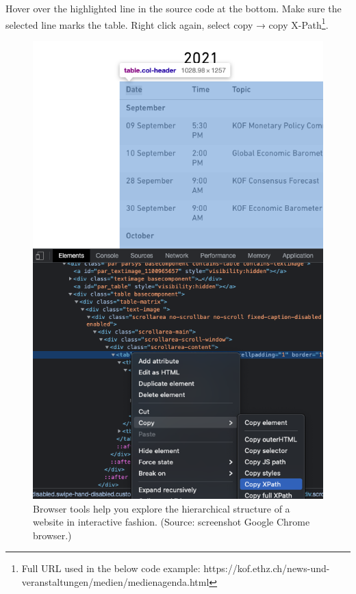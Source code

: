\documentclass[
  12pt,
  letterpaper,
]{krantz}
\begin{document}
Hover over the highlighted line in the source code at the bottom. Make
sure the selected line marks the table. Right click again, select copy →
copy X-Path\footnote{Full URL used in the below code example:
  https://kof.ethz.ch/news-und-veranstaltungen/medien/medienagenda.html}.

\begin{figure}

{\centering \includegraphics{./images/xpath.png}

}

\caption{Browser tools help you explore the hierarchical structure of a
website in interactive fashion. (Source: screenshot Google Chrome
browser.)}

\end{figure}
\end{document}
